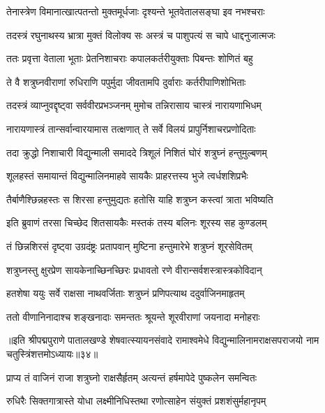 \twolineshloka
{तेनास्त्रेण विमानात्खात्पतन्तो मुक्तमूर्धजाः}
{दृश्यन्ते भूतवेतालसङ्घा इव नभश्चराः}%

\twolineshloka
{तदस्त्रं रघुनाथस्य भ्रात्रा मुक्तं विलोक्य सः}
{अस्त्रं च पाशुपत्यं स चापे धाद्दनुजात्मजः}%

\twolineshloka
{ततः प्रवृत्ता वेताला भूताः प्रेतनिशाचराः}
{कपालकर्तरीयुक्ताः पिबन्तः शोणितं बहु}%

\twolineshloka
{ते वै शत्रुघ्नवीराणां रुधिराणि पपुर्मुदा}
{जीवतामपि दुर्वाराः कर्तरीपाणिशोभिताः}%

\twolineshloka
{तदस्त्रं व्याप्नुवद्दृष्ट्वा सर्ववीरप्रभञ्जनम्}
{मुमोच तन्निरासाय चास्त्रं नारायणाभिधम्}%

\twolineshloka
{नारायणास्त्रं तान्सर्वान्वारयामास तत्क्षणात्}
{ते सर्वे विलयं प्रापुर्निशाचरप्रणोदिताः}%

\twolineshloka
{तदा क्रुद्धो निशाचारी विद्युन्माली समाददे}
{त्रिशूलं निशितं घोरं शत्रुघ्नं हन्तुमुल्बणम्}%

\twolineshloka
{शूलहस्तं समायान्तं विद्युन्मालिनमाहवे}
{सायकैः प्राहरत्तस्य भुजे त्वर्धशशिप्रभैः}%

\twolineshloka
{तैर्बाणैश्छिन्नहस्तः स शिरसा हन्तुमुद्यतः}
{हतोसि याहि शत्रुघ्न कस्त्वां त्राता भविष्यति}%

\twolineshloka
{इति ब्रुवाणं तरसा चिच्छेद शितसायकैः}
{मस्तकं तस्य बलिनः शूरस्य सह कुण्डलम्}%

\twolineshloka
{तं छिन्नशिरसं दृष्ट्वा उग्रदंष्ट्रः प्रतापवान्}
{मुष्टिना हन्तुमारेभे शत्रुघ्नं शूरसेवितम्}%

\twolineshloka
{शत्रुघ्नस्तु क्षुरप्रेण सायकेनाच्छिनच्छिरः}
{प्रधावतो रणे वीरान्सर्वशस्त्रास्त्रकोविदान्}%

\twolineshloka
{हतशेषा ययुः सर्वे राक्षसा नाथवर्जिताः}
{शत्रुघ्नं प्रणिपत्याथ ददुर्वाजिनमाहृतम्}%

\twolineshloka
{ततो वीणानिनादाश्च शङ्खनादाः समन्ततः}
{श्रूयन्ते शूरवीराणां जयनादा मनोहराः}%

॥इति श्रीपद्मपुराणे पातालखण्डे शेषवात्स्यायनसंवादे रामाश्वमेधे विद्युन्मालिनामराक्षसपराजयो नाम चतुस्त्रिंशत्तमोऽध्यायः॥३४॥



\twolineshloka
{प्राप्य तं वाजिनं राजा शत्रुघ्नो राक्षसैर्हृतम्}
{अत्यन्तं हर्षमापेदे पुष्कलेन समन्वितः}%

\twolineshloka
{रुधिरैः सिक्तगात्रास्ते योधा लक्ष्मीनिधिस्तथा}
{रणोत्साहेन संयुक्तं प्रशशंसुर्महानृपम्}%

